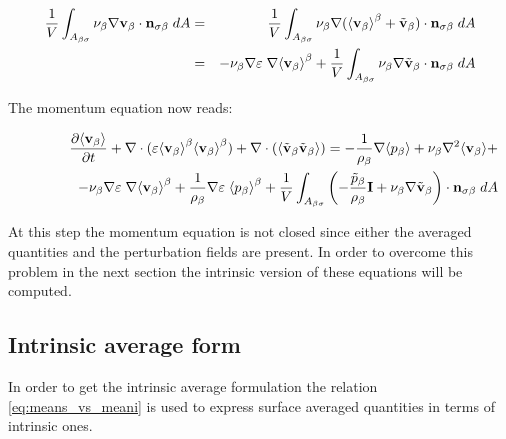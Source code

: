 \begin{eqnarray}
\dfrac{1}{V} \int_{A_{\beta \sigma}} \nu_{\beta} \nabla \textbf{v}_{\beta} \cdot \mathbf{n}_{\sigma \beta} \;dA &=& \dfrac{1}{V} \int_{A_{\beta \sigma}} \nu_{\beta} \nabla ({\left< \textbf{v}_{\beta} \right>}^{\beta} +\tilde{\textbf{v}}_{\beta}) \cdot \mathbf{n}_{\sigma \beta} \;dA   \nonumber \\
&=& - \nu_{\beta} \nabla \varepsilon \; \nabla {\left< \textbf{v}_{\beta}\right>}^{\beta} + \dfrac{1}{V} \int_{A_{\beta \sigma}} \nu_{\beta} \nabla \tilde{\textbf{v}}_{\beta} \cdot \mathbf{n}_{\sigma \beta} \;dA
\end{eqnarray}


The momentum equation now reads:

\begin{eqnarray}
\dfrac{\partial {\left< \textbf{v}_{\beta}\right>}}{\partial t} + \nabla \cdot (\varepsilon {\left< \textbf{v}_{\beta}\right>}^{\beta}{\left< \textbf{v}_{\beta} \right>}^{\beta}) + \nabla \cdot ({\left< \tilde{\textbf{v}}_{\beta}\tilde{\textbf{v}}_{\beta} \right>}) = -\dfrac{1}{\rho_{\beta}} \nabla {\left< p_{\beta}\right>} + \nu_{\beta}\nabla^2 {\left< \textbf{v}_{\beta} \right>} + \nonumber \\
\qquad \qquad - \nu_{\beta} \nabla \varepsilon \; \nabla {\left< \textbf{v}_{\beta}\right>}^{\beta} +\dfrac{1}{\rho_{\beta}}\nabla\varepsilon \; {\left< p_{\beta} \right>}^{\beta} +\dfrac{1}{V} \displaystyle\int_{A_{\beta \sigma}} \left( -\dfrac{\tilde{p}_{\beta}}{\rho_{\beta}} \mathbf{I} + \nu_{\beta} \nabla \tilde{\textbf{v}}_{\beta}  \right)\cdot \mathbf{n}_{\sigma \beta} \;dA
\label{eq:NS_2}
\end{eqnarray}

At this step the momentum equation is not closed since either the averaged quantities and the perturbation fields are present.
In order to overcome this problem in the next section the intrinsic version of these equations will be computed. 

\subsection{Intrinsic average form}
In order to get the intrinsic average formulation the relation \eqref{eq:means_vs_meani} is used to express surface averaged quantities in terms of intrinsic ones.

